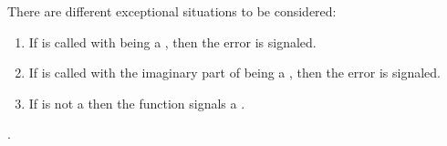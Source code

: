 \documentclass[../Exponentials-Logarithms-Trigonometry.tex]{subfiles}
\begin{document}
\DExceptional{}

There are different exceptional situations to be considered:
\begin{enumerate}
\item If  is called with
   being a , then the
   error is signaled.
\item If  is called with the imaginary
  part of  being a , then the
   error is signaled.
\item If  is not a \CL{}
   then the function  signals a
  .
\end{enumerate}

\DSeeAlso{}

.
\end{document}
